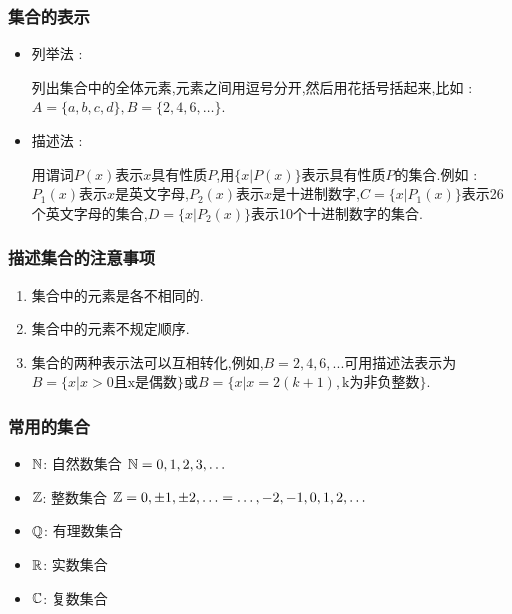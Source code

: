 {{\subsubsection{集合的表示}{
  \begin{itemize}
    \item {
          列举法 :

          列出集合中的全体元素,元素之间用逗号分开,然后用花括号括起来,比如 : $A = \{a,b,c,d\},B = \{2,4,6,\dots\}$.
          }
    \item {
          描述法 :

          用谓词$P(x)$表示$x$具有性质$P$,用$\{x | P(x)\}$表示具有性质$P$的集合.例如 : $P_1(x)$表示$x$是英文字母,$P_2(x)$表示$x$是十进制数字,$C = \{x | P_1(x)\}$表示26个英文字母的集合,$D = \{x | P_2(x)\}$表示10个十进制数字的集合.
          }
  \end{itemize}
}%

\subsubsection{描述集合的注意事项}{
  \begin{enumerate}
    \item 集合中的元素是各不相同的.
    \item 集合中的元素不规定顺序.
    \item {
          集合的两种表示法可以互相转化,例如,$B={2,4,6,...}$可用描述法表示为$B=\{x|x>0\mbox{且x是偶数}\}$或$B=\{x|x=2(k+1),\mbox{k为非负整数}\}$.
          }
  \end{enumerate}
}%

\subsubsection{常用的集合}{
  \begin{itemize}
    \item $\operatorname{\mathbb{N}}$: 自然数集合 $\operatorname{\mathbb{N}} = {0,1,2,3,\dots}$
    \item $\operatorname{\mathbb{Z}}$: 整数集合 $\operatorname{\mathbb{Z}} = {0, \pm 1, \pm 2, \dots} = {\dots, -2, -1, 0, 1, 2, \dots}$
    \item $\operatorname{\mathbb{Q}}$: 有理数集合
    \item $\operatorname{\mathbb{R}}$: 实数集合
    \item $\operatorname{\mathbb{C}}$: 复数集合
  \end{itemize}
}%

}}
